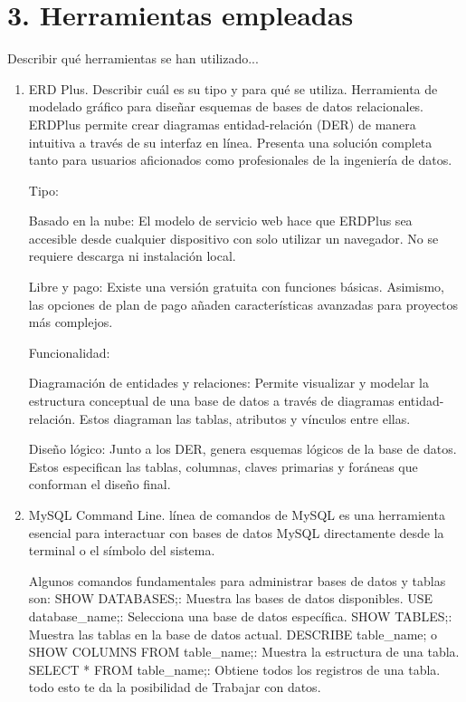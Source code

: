 \documentclass{article}
\begin{document}
\section{3. Herramientas empleadas}
    Describir qué herramientas se han utilizado...
    \begin{enumerate}
        \item ERD Plus. Describir cuál es su tipo y para qué se utiliza.
        Herramienta de modelado gráfico para diseñar esquemas de bases de datos relacionales. ERDPlus permite crear diagramas entidad-relación (DER) de manera intuitiva a través de su interfaz en línea. Presenta una solución completa tanto para usuarios aficionados como profesionales de la ingeniería de datos.
        
        Tipo:
        
        Basado en la nube: El modelo de servicio web hace que ERDPlus sea accesible desde cualquier dispositivo con solo utilizar un navegador. No se requiere descarga ni instalación local.
        
        Libre y pago: Existe una versión gratuita con funciones básicas. Asimismo, las opciones de plan de pago añaden características avanzadas para proyectos más complejos.
        
        Funcionalidad:
        
        Diagramación de entidades y relaciones: Permite visualizar y modelar la estructura conceptual de una base de datos a través de diagramas entidad-relación. Estos diagraman las tablas, atributos y vínculos entre ellas.
        
        Diseño lógico: Junto a los DER, genera esquemas lógicos de la base de datos. Estos especifican las tablas, columnas, claves primarias y foráneas que conforman el diseño final.
        
        \item  MySQL Command Line.
        línea de comandos de MySQL es una herramienta esencial para interactuar con bases de datos MySQL directamente desde la terminal o el símbolo del sistema.
        
        Algunos comandos fundamentales para administrar bases de datos y tablas son:
        SHOW DATABASES;: Muestra las bases de datos disponibles.
        USE database\_name;: Selecciona una base de datos específica.
        SHOW TABLES;: Muestra las tablas en la base de datos actual.
        DESCRIBE table\_name; o SHOW COLUMNS FROM table\_name;: Muestra la estructura de una tabla.
        SELECT * FROM table\_name;: Obtiene todos los registros de una tabla.
        todo esto te da la posibilidad de Trabajar con datos.
        
    \end{enumerate}        
    \newpage
    
\end{document}
